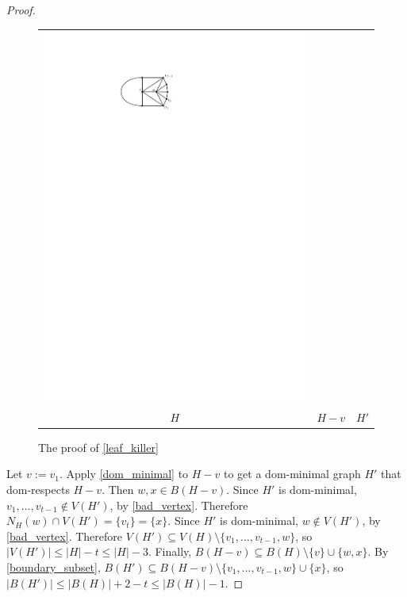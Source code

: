 \documentclass[12pt]{article}
\theoremstyle{definition}
\begin{document}
\begin{proof}
\begin{figure}[htbp]
\begin{tabular}{ccc}
      \includegraphics[page=3]{figs/killing_a_leaf} \\
      $H$ & $H-v$ & $H'$
    \end{tabular}
    \caption{The proof of \cref{leaf_killer}}
    \label{killing_a_leaf}
  \end{figure}

  Let $v:=v_1$. Apply \cref{dom_minimal} to $H-v$ to get a dom-minimal graph $H'$ that dom-respects $H-v$.  Then $w,x\in B(H-v)$.  Since $H'$ is dom-minimal, $v_1,\ldots,v_{t-1}\not\in V(H')$, by \cref{bad_vertex}.  Therefore $N_H(w)\cap V(H')=\{v_t\}=\{x\}$. Since $H'$ is dom-minimal, $w\not\in V(H')$, by \cref{bad_vertex}. Therefore $V(H')\subseteq V(H)\setminus\{v_1,\ldots,v_{t-1},w\}$, so $|V(H')|\le |H|-t\le |H|-3$.  Finally, $B(H-v)\subseteq B(H)\setminus \{v\}\cup\{w,x\}$. By \cref{boundary_subset}, $B(H')\subseteq B(H-v)\setminus\{v_1,\ldots,v_{t-1},w\}\cup\{x\}$, so $|B(H')|\le |B(H)|+2-t\le |B(H)|-1$.
\end{proof}
\end{document}
